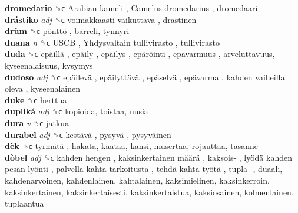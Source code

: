 \textbf{dromedario} ␝ϲ   Arabian kameli ,  Camelus dromedarius , dromedaari  \\
\textbf{drástiko} \emph{adj}  ␝ϲ   voimakkaasti vaikuttava , drastinen  \\
\textbf{drùm} ␝ϲ   pönttö , barreli, tynnyri  \\
\textbf{duana} \emph{n}  ␝ϲ   USCB ,  Yhdysvaltain tullivirasto , tullivirasto  \\
\textbf{duda} ␝ϲ   epäillä ,  epäily ,  epäilys ,  epäröinti ,  epävarmuus , arveluttavuus, kyseenalaisuus, kysymys  \\
\textbf{dudoso} \emph{adj}  ␝ϲ   epäilevä ,  epäilyttävä ,  epäselvä ,  epävarma ,  kahden vaiheilla oleva , kyseenalainen  \\
\textbf{duke} ␝ϲ  herttua  \\
\textbf{dupliká} \emph{adj}  ␝ϲ  kopioida, toistaa, uusia  \\
\textbf{dura} \emph{v}  ␝ϲ  jatkua  \\
\textbf{durabel} \emph{adj}  ␝ϲ   kestävä ,  pysyvä ,  pysyväinen   \\
\textbf{dèk} ␝ϲ   tyrmätä , hakata, kaataa, kansi, musertaa, rojauttaa, tasanne  \\
\textbf{dòbel} \emph{adj}  ␝ϲ   kahden hengen ,  kaksinkertainen määrä ,  kaksois- ,  lyödä kahden pesän lyönti ,  palvella kahta tarkoitusta ,  tehdä kahta työtä ,  tupla- , duaali, kahdenarvoinen, kahdenlainen, kahtalainen, kaksimielinen, kaksinkerroin, kaksinkertainen, kaksinkertaisesti, kaksinkertaistua, kaksiosainen, kolmenlainen, tuplaantua  \\
